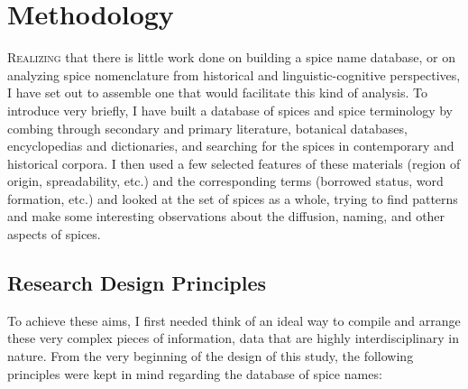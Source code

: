 

\chapter{Methodology}
\label{ch:methodology}


\lettrine[lines=\iniciale]{\textcolor{\accentcolor}{R}}{ealizing} that there is little work done on building a spice name database, or on analyzing spice nomenclature from historical and linguistic-cognitive perspectives, I have set out to assemble one that would facilitate this kind of analysis. 
To introduce very briefly, I have built a database of spices and spice terminology by combing through secondary and primary literature, botanical databases, encyclopedias and dictionaries, and searching for the spices in contemporary and historical corpora. I then used a few selected features of these materials (region of origin, spreadability, etc.) and the corresponding terms (borrowed status, word formation, etc.) and looked at the set of spices as a whole, trying to find patterns and make some interesting observations about the diffusion, naming, and other aspects of spices.


\section{Research Design Principles}

To achieve these aims, I first needed think of an ideal way to compile and arrange these very complex pieces of information, data that are highly interdisciplinary in nature. From the very beginning of the design of this study, the following principles were kept in mind regarding the database of spice names: 

